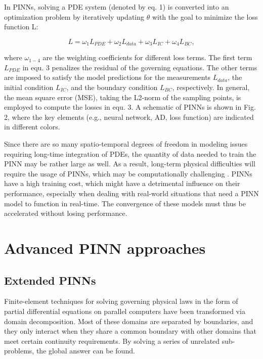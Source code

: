 \documentclass[conference,compsoc]{IEEEtran}
\begin{document}
In PINNs, solving a PDE system (denoted by eq. 1) is
converted into an optimization problem by iteratively
updating $\theta$ with the goal to minimize the loss function L:

\begin{equation}
    L = \omega_1L_{PDE} + \omega_2L_{data} + \omega_3L_{IC} + \omega_4L_{BC},
\end{equation}

where $\omega_{1-4}$ are the weighting coefficients for different loss
terms. The first term $L_{PDE}$ in equ. 3 penalizes the residual
of the governing equations. The other terms are imposed to
satisfy the model predictions for the measurements $L_{data}$,
the initial condition $L_{IC}$, and the boundary condition $L_{BC}$,
respectively. In general, the mean square error (MSE),
taking the L2-norm of the sampling points, is employed to
compute the losses in equ. 3. A schematic of PINNs is shown in Fig. 2, where the key
elements (e.g., neural network, AD, loss function) are
indicated in different colors.



Since there are so many spatio-temporal degrees of freedom in modeling issues requiring long-time integration of PDEs, the quantity of data needed to train the PINN may be rather large as well\cite{raissi2019physics}. As a result, long-term physical difficulties will require the usage of PINNs, which may be computationally challenging \cite{cai2021physics}. PINNs have a high training cost, which might have a detrimental influence on their performance, especially when dealing with real-world situations that need a PINN model to function in real-time\cite{raissi2019physics}. The convergence of these models must thus be accelerated without losing performance.


\section{Advanced PINN approaches}

\subsection{Extended PINNs}
Finite-element techniques for solving governing physical laws in the form of partial differential equations on parallel computers have been transformed via domain decomposition\cite{jagtap2020extended}\cite{goswami2019transfer}. Most of these domains are separated by boundaries, and they only interact when they share a common boundary with other domains that meet certain continuity requirements. By solving a series of unrelated sub-problems, the global answer can be found.
\end{document}
